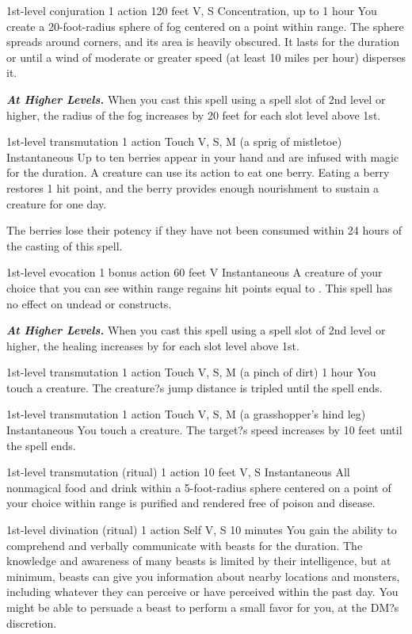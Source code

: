 \documentclass[10pt,twoside,twocolumn,openany]{book}
\newcommand{\castingModifier}{3}
\newcommand\impact[1]{
	\textbf{\textit{#1}}
}
\begin{document}
{1st-level conjuration}
{\color{action} 1 action}
{120 feet}
{V, S}
{{\color{concentration}Concentration}, up to 1 hour}
You create a 20-foot-radius sphere of fog centered on a point within range. The sphere spreads around corners, and its area is heavily obscured. It lasts for the duration or until a wind of moderate or greater speed (at least 10 miles per hour) disperses it.

\impact{At Higher Levels.} When you cast this spell using a spell slot of 2nd level or higher, the radius of the fog increases by 20 feet for each slot level above 1st.

{1st-level transmutation}
{\color{action} 1 action}
{Touch}
{V, S, M (a sprig of mistletoe)}
{Instantaneous}
Up to ten berries appear in your hand and are infused with magic for the duration. A creature can use its action to eat one berry. Eating a berry restores 1 hit point, and the berry provides enough nourishment to sustain a creature for one day.

The berries lose their potency if they have not been consumed within 24 hours of the casting of this spell.

{1st-level evocation}
{\color{bonusaction} 1 bonus action}
{60 feet}
{V}
{Instantaneous}
%
A creature of your choice that you can see within range regains hit points equal to \dice{1d4 + \castingModifier}. This spell has no effect on undead or constructs.

\impact{At Higher Levels.} When you cast this spell using a spell slot of 2nd level or higher, the healing increases by  for each slot level above 1st.

{1st-level transmutation}
{\color{action} 1 action}
{Touch}
{V, S, M (a pinch of dirt)}
{1 hour}
%
You touch a creature. The creature?s jump distance is tripled until the spell ends.

{1st-level transmutation}
{\color{action} 1 action}
{Touch}
{V, S, M (a grasshopper's hind leg)}
{Instantaneous}
%
You touch a creature. The target?s speed increases by 10 feet until the spell ends.

{1st-level transmutation {\color{ritual}(ritual)}}
{\color{action} 1 action}
{10 feet}
{V, S}
{Instantaneous}
%
All nonmagical food and drink within a 5-foot-radius sphere centered on a point of your choice within range is purified and rendered free of poison and disease.

{1st-level divination {\color{ritual}(ritual)}}
{\color{action} 1 action}
{Self}
{V, S}
{10 minutes}
%
You gain the ability to comprehend and verbally communicate with beasts for the duration. The knowledge and awareness of many beasts is limited by their intelligence, but at minimum, beasts can give you information about nearby locations and monsters, including whatever they can perceive or have perceived within the past day. You might be able to persuade a beast to perform a small favor for you, at the DM?s discretion.
\end{document}
